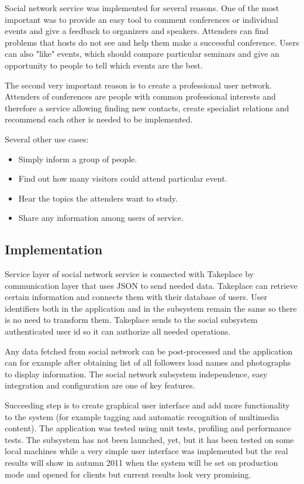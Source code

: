 \documentclass{llncs}
\begin{document}
Social network service was implemented for several reasons. One of the most
important was to provide an easy tool to comment conferences or individual
events and give a feedback to organizers and speakers.  Attenders can find
problems that hosts do not see and help them make a successful conference.
Users can also "like" events, which should compare particular seminars and
give an opportunity to people to tell which events are the best.

The second very
important reason is to create a professional user network.  Attenders of
conferences are people with common professional interests and therefore a
service allowing finding new contacts, create specialist relations and
recommend each other is needed to be implemented.

Several other use cases:
\begin{itemize}
\item Simply inform a group of people.
\item Find out how many visitors could attend particular event.
\item Hear the topics the attenders want to study.
\item Share any information among users of service.
\end{itemize}

\subsection{Implementation}
Service layer of social network service is connected with Takeplace by
communication layer that uses JSON to send needed data. Takeplace can retrieve
certain information and connects them with their database of users. User
identifiers both in the application and in the subsystem remain the same so
there is no need to transform them. Takeplace sends to the social subsystem
authenticated user id so it can authorize all needed operations.

Any data fetched from social network can be post-processed and the application
can for example after obtaining list of all followers load names and
photographs to display information. The social network subsystem independence,
easy integration and configuration are one of key features.

Succeeding step is to create graphical user interface and add more
functionality to the system (for example tagging and automatic recognition of
multimedia content).  The application was tested using unit tests, profiling
and performance tests. The subsystem has not been launched, yet, but it has
been tested on some local machines while a very simple user interface was
implemented but the real results will show in autumn 2011 when the system will
be set on production mode and opened for clients but current results look very
promising.
\end{document}
